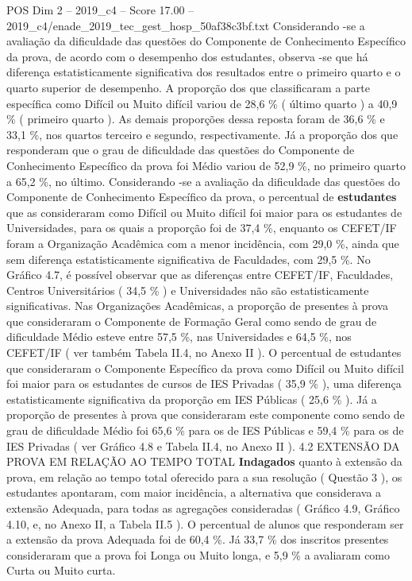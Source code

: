 \begin{textsample}{POS Dim 2 – 2019\_c4 – Score 17.00 – 2019\_c4/enade\_2019\_tec\_gest\_hosp\_50af38c3bf.txt}
Considerando -se a avaliação da dificuldade das questões do Componente de Conhecimento Específico da prova, de acordo com o desempenho dos estudantes, observa -se que há diferença estatisticamente significativa dos resultados entre o primeiro quarto e o quarto superior de desempenho.
A proporção dos que classificaram a parte específica como Difícil ou Muito difícil variou de 28,6 \% ( último quarto ) a 40,9 \% ( primeiro quarto ).
As demais proporções dessa reposta foram de 36,6 \% e 33,1 \%, nos quartos terceiro e segundo, respectivamente.
Já a proporção dos que responderam que o grau de dificuldade das questões do Componente de Conhecimento Específico da prova foi Médio variou de 52,9 \%, no primeiro quarto a 65,2 \%, no último.
Considerando -se a avaliação da dificuldade das questões do Componente de Conhecimento Específico da prova, o percentual de \textbf{estudantes} que as consideraram como Difícil ou Muito difícil foi maior para os estudantes de Universidades, para os quais a proporção foi de 37,4 \%, enquanto os CEFET/IF foram a Organização Acadêmica com a menor incidência, com 29,0 \%, ainda que sem diferença estatisticamente significativa de Faculdades, com 29,5 \%.
No Gráfico 4.7, é possível observar que as diferenças entre CEFET/IF, Faculdades, Centros Universitários ( 34,5 \% ) e Universidades não são estatisticamente significativas.
Nas Organizações Acadêmicas, a proporção de presentes à prova que consideraram o Componente de Formação Geral como sendo de grau de dificuldade Médio esteve entre 57,5 \%, nas Universidades e 64,5 \%, nos CEFET/IF ( ver também Tabela II.4, no Anexo II ).
O percentual de estudantes que consideraram o Componente Específico da prova como Difícil ou Muito difícil foi maior para os estudantes de cursos de IES Privadas ( 35,9 \% ), uma diferença estatisticamente significativa da proporção em IES Públicas ( 25,6 \% ).
Já a proporção de presentes à prova que consideraram este componente como sendo de grau de dificuldade Médio foi 65,6 \% para os de IES Públicas e 59,4 \% para os de IES Privadas ( ver Gráfico 4.8 e Tabela II.4, no Anexo II ). 4.2 EXTENSÃO DA PROVA EM RELAÇÃO AO TEMPO TOTAL \textbf{Indagados} quanto à extensão da prova, em relação ao tempo total oferecido para a sua resolução ( Questão 3 ), os estudantes apontaram, com maior incidência, a alternativa que considerava a extensão Adequada, para todas as agregações consideradas ( Gráfico 4.9, Gráfico 4.10, e, no Anexo II, a Tabela II.5 ).
O percentual de alunos que responderam ser a extensão da prova Adequada foi de 60,4 \%.
Já 33,7 \% dos inscritos presentes consideraram que a prova foi Longa ou Muito longa, e 5,9 \% a avaliaram como Curta ou Muito curta.

\end{textsample}
